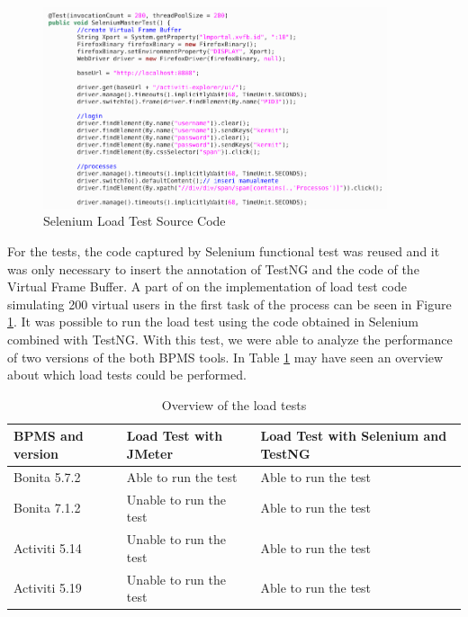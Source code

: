 \documentclass[runningheads,a4paper]{llncs}
\begin{document}
\begin{figure}[ht]
\centering
\includegraphics[width=0.9\textwidth]{figuras/codigoCargaSelenium.png}
\caption{Selenium Load Test Source Code}
\label{fig:codigoCargaSelenium}
\end{figure}


For the tests, the code captured by Selenium functional test was reused and it was only necessary to insert the annotation of TestNG and the code of the Virtual Frame Buffer. A part of on the implementation of load test code simulating 200 virtual users in the first task of the process can be seen in Figure \ref{fig:codigoCargaSelenium}. It was possible to run the load test using the code obtained in Selenium combined with TestNG. With this test, we were able to analyze the performance of two versions of the both BPMS tools. In Table \ref{tab:foiPossivelCarga} may have seen an overview about which load tests could be performed. 

\begin{table}
\centering
\begin{tabular}{p{3cm}|p{3cm}|p{3cm}}
\hline
BPMS and version & Load Test with JMeter & Load Test with Selenium and TestNG \\\hline
Bonita 5.7.2 & Able to run the test & Able to run the test \\\hline
Bonita 7.1.2 & Unable to run the test & Able to run the test \\\hline
Activiti 5.14 & Unable to run the test & Able to run the test \\\hline
Activiti 5.19 & Unable to run the test & Able to run the test \\\hline
\end{tabular}
\caption{Overview of the load tests}
\label{tab:foiPossivelCarga}
\end{table}
\end{document}
